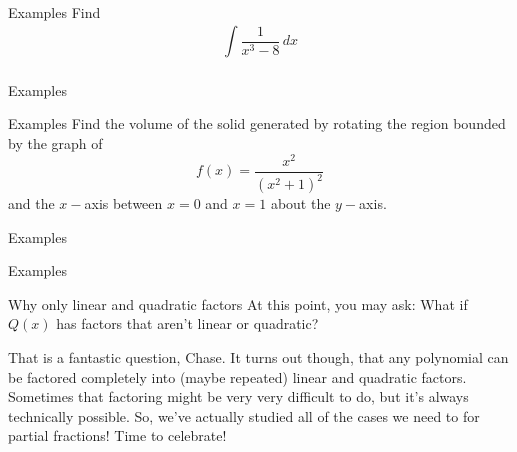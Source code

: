 \documentclass[presentation]{beamer}
\begin{document}
\begin{frame}[label={sec:org2b54810}]{Examples}
Find
\[
\int\limits_{}^{} \frac{1}{x^3-8}\,dx \]
\vspace{10in}
\end{frame}

\begin{frame}[label={sec:org6060764}]{Examples}
\end{frame}

\begin{frame}[label={sec:orgaf80452}]{Examples}
Find the volume of the solid generated by rotating the region bounded
by the graph of
\[
f(x) = \frac{x^2}{\left( x^2+1 \right)^2} \]
and the \(x-\)axis between \(x=0\) and \(x=1\) about the \(y-\)axis.
\vspace{10in}
\end{frame}

\begin{frame}[label={sec:org8b4e8fa}]{Examples}
\end{frame}

\begin{frame}[label={sec:orgc414f70}]{Examples}
\end{frame}

\begin{frame}[label={sec:org194164d}]{Why only linear and quadratic factors}
At this point, you may ask:  What if \(Q (x)\) has factors that
aren't linear or quadratic?

That is a fantastic question, Chase.  It turns out though, that any
polynomial can be factored completely into (maybe repeated) linear and
quadratic factors.
Sometimes that factoring might be very very difficult to do, but it's
always technically possible.  So, we've actually studied all of the
cases we need to for partial fractions!  Time to celebrate!
\end{frame}
\end{document}
